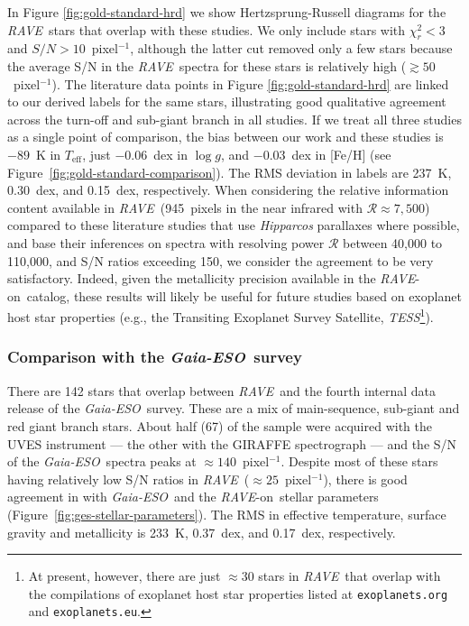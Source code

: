 \documentclass[preprint]{aastex61}
\newcommand{\acronym}[1]{{\small{#1}}}
\newcommand{\project}[1]{\textsl{#1}}
\newcommand{\rave}{\project{\acronym{RAVE}}}
\newcommand{\ges}{\project{Gaia-ESO}}
\newcommand{\raveon}{\rave-on}
\newcommand{\teff}{T_{\mathrm{eff}}}
\newcommand{\logg}{\log g}
\begin{document}
In Figure \ref{fig:gold-standard-hrd} we show Hertzsprung-Russell diagrams 
for the \rave\ stars that overlap with these studies.  We only include stars 
with $\chi_r^2 < 3$ and $S/N > 10$~pixel$^{-1}$, although the latter cut 
removed only a few stars because the average S/N in the \rave\ spectra for
these stars is relatively high ($\gtrsim{}50$~pixel$^{-1}$).  The literature 
data points in Figure \ref{fig:gold-standard-hrd} are linked to our derived
labels for the same stars, illustrating good qualitative agreement across 
the turn-off and sub-giant branch in all studies.  If we treat all three 
studies as a single point of comparison, the bias between our work and these 
studies is $-89$~K in $\teff$, just $-0.06$~dex in $\logg$, and $-0.03$~dex 
in [Fe/H] (see Figure~\ref{fig:gold-standard-comparison}).  The RMS deviation
in labels are 237~K, 0.30~dex, and 0.15~dex, respectively.  When considering 
the relative information content available in \rave\ (945~pixels in the near 
infrared with $\mathcal{R} \approx 7{,}500$) compared to these literature 
studies that use \project{Hipparcos} parallaxes where possible, and base 
their inferences on spectra with resolving power $\mathcal{R}$ between 
40,000 to 110,000, and S/N ratios exceeding 150, we consider the agreement 
to be very satisfactory.  Indeed, given the metallicity precision available
in the \raveon\ catalog, these results will likely be useful for future 
studies based on exoplanet host star properties (e.g., 
the Transiting Exoplanet Survey Satellite, \project{TESS}\footnote{At present, however, there are just $\approx$30 
stars in \rave\ that overlap with the compilations of exoplanet host star 
properties listed at \texttt{exoplanets.org} and \texttt{exoplanets.eu}.}).


\subsubsection{Comparison with the \ges\ survey}
\label{sec:validation-ges}


There are 142 stars that overlap between \rave\ and the fourth internal
data release of the \ges\ survey. These are a mix of main-sequence, 
sub-giant and red giant branch stars.  About half (67) of the sample 
were acquired with the \acronym{UVES} instrument --- the other with the 
\acronym{GIRAFFE} spectrograph --- and the S/N of the \ges\ spectra peaks 
at $\approx140$~pixel$^{-1}$.  Despite most of these stars having relatively 
low S/N ratios in \rave\ ($\approx 25$~pixel$^{-1}$), there is good agreement
in with \ges\ and the \raveon\ stellar parameters (Figure~\ref{fig:ges-stellar-parameters}).  
The RMS in effective temperature, surface gravity and metallicity is 233~K, 
0.37~dex, and 0.17~dex, respectively.  
\end{document}
